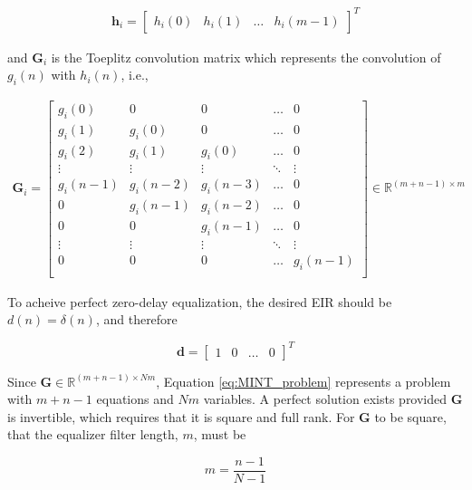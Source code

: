\begin{eqnarray}
	\boldsymbol{h}_i = 
		\begin{bmatrix}
			h_i(0) & h_i(1) & \dots & h_i(m-1)
		\end{bmatrix}^T
\end{eqnarray}

\noindent
and $\boldsymbol{G}_i$ is the Toeplitz convolution matrix which represents the convolution of $g_i(n)$ with $h_i(n)$, i.e.,

\begin{eqnarray}
	\boldsymbol{G}_i = 
	\begin{bmatrix} 
		g_i(0)     & 0           & 0              & \dots    & 0  \\
		g_i(1)     & g_i(0)    & 0              & \dots    & 0  \\
		g_i(2)    & g_i(1)     & g_i(0)      & \dots    & 0  \\
		\vdots    & \vdots    & \vdots     & \ddots & \vdots  \\
		g_i(n-1) & g_i(n-2) & g_i(n-3) & \dots   & 0 \\
		0            & g_i(n-1)  & g_i(n-2) & \dots   & 0 \\
		0            & 0             & g_i(n-1) & \dots   & 0 \\
		\vdots    & \vdots    & \vdots     & \ddots & \vdots  \\
		0            & 0             & 0             & \dots   & g_i(n-1) \\
	\end{bmatrix} 
	\in \mathbb{R}^{(m+n-1)\times m}
\end{eqnarray}

\noindent
To acheive perfect zero-delay equalization, the desired EIR should be $d(n)=\delta(n)$, and therefore

\begin{equation}
	\boldsymbol{d} =
		\begin{bmatrix}
			1 & 0 & \dots & 0
		\end{bmatrix}^T
\end{equation}

Since $\boldsymbol{G} \in \mathbb{R}^{(m+n-1)\times Nm}$, Equation \ref{eq:MINT_problem} represents a problem with $m+n-1$ equations and $Nm$ variables. A perfect solution exists provided $\boldsymbol{G}$ is invertible, which requires that it is square and full rank. For $\boldsymbol{G}$ to be square, that the equalizer filter length, $m$, must be

\begin{equation}
	m = \frac{n-1}{N-1}
\end{equation}

